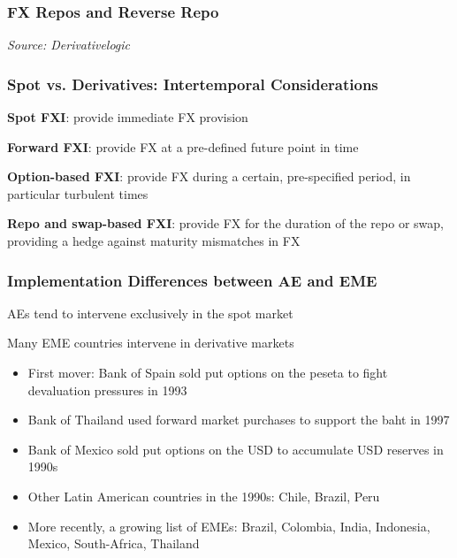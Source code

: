\documentclass{beamer}
\newenvironment{wideitemize}{\itemize\addtolength{\itemsep}{10pt}}{\enditemize}
\begin{document}
\begin{frame}
\frametitle{FX Repos and Reverse Repo}

\bigskip
\emph{Source: Derivativelogic \href{https://derivativelogic.com/wp-content/uploads/Repo-vs-Reverse-Repo.jpg)}{}}
\end{frame}


\begin{frame}
  \frametitle{Spot vs. Derivatives: Intertemporal Considerations}
  \begin{wideitemize}
    \item \textbf{Spot FXI}: provide immediate FX provision
    \item \textbf{Forward FXI}: provide FX at a pre-defined future point in time
    \item \textbf{Option-based FXI}: provide FX during a certain, pre-specified period, in particular turbulent times
    \item \textbf{Repo and swap-based FXI}: provide FX for the duration of the repo or swap, providing a hedge against maturity mismatches in FX
  \end{wideitemize}
\end{frame}


\begin{frame}
  \frametitle{Implementation Differences between AE and EME}
  \begin{wideitemize}
    \item AEs tend to intervene exclusively in the spot market
    \item Many EME countries intervene in derivative markets
      \begin{itemize}
      \item First mover: Bank of Spain sold put options on the peseta to fight devaluation pressures in 1993
      \item Bank of Thailand used forward market purchases to support the baht in 1997
      \item Bank of Mexico sold put options on the USD to accumulate USD reserves in 1990s
      \item Other Latin American countries in the 1990s: Chile, Brazil, Peru
      \item More recently, a growing list of EMEs: Brazil, Colombia, India, Indonesia, Mexico, South-Africa, Thailand
      \end{itemize}
  \end{wideitemize}
\end{frame}
\end{document}

